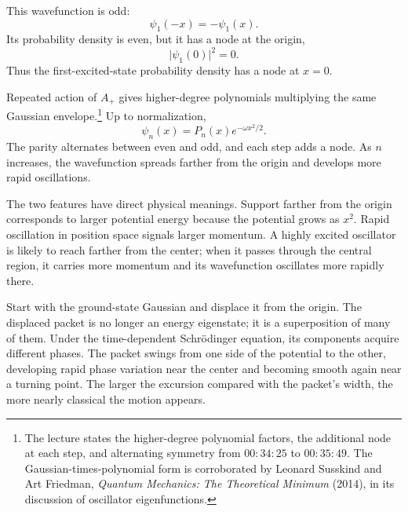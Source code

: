 This wavefunction is odd:
\begin{equation}
\psi_{1}(-x)=-\psi_{1}(x).
\end{equation}
Its probability density is even, but it has a node at the origin,
\begin{equation}
\lvert\psi_{1}(0)\rvert^{2}=0.
\end{equation}
Thus the first-excited-state probability density has a node at \(x=0\).

Repeated action of \(A_{+}\) gives higher-degree polynomials multiplying the same Gaussian envelope.\footnote{The lecture states the higher-degree polynomial factors, the additional node at each step, and alternating symmetry from \(00{:}34{:}25\) to \(00{:}35{:}49\). The Gaussian-times-polynomial form is corroborated by Leonard Susskind and Art Friedman, \emph{Quantum Mechanics: The Theoretical Minimum} (2014), in its discussion of oscillator eigenfunctions.} Up to normalization,
\begin{equation}
\psi_{n}(x)=P_{n}(x)e^{-\omega x^{2}/2}.
\end{equation}
The parity alternates between even and odd, and each step adds a node. As \(n\) increases, the wavefunction spreads farther from the origin and develops more rapid oscillations.

The two features have direct physical meanings. Support farther from the origin corresponds to larger potential energy because the potential grows as \(x^{2}\). Rapid oscillation in position space signals larger momentum. A highly excited oscillator is likely to reach farther from the center; when it passes through the central region, it carries more momentum and its wavefunction oscillates more rapidly there.

\begin{classroomqa}
\end{classroomqa}

Start with the ground-state Gaussian and displace it from the origin. The displaced packet is no longer an energy eigenstate; it is a superposition of many of them. Under the time-dependent Schr\"odinger equation, its components acquire different phases. The packet swings from one side of the potential to the other, developing rapid phase variation near the center and becoming smooth again near a turning point. The larger the excursion compared with the packet's width, the more nearly classical the motion appears.

